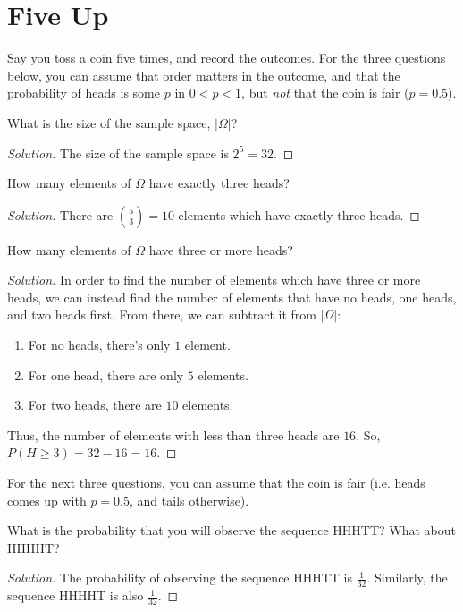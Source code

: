 \documentclass{article}
\newenvironment{solution}{\begin{proof}[Solution]}{\end{proof}}
\begin{document}
\newpage

\section{Five Up}
Say you toss a coin five times, and record the outcomes. For the three questions below, you can assume that order matters in the outcome, and that the probability of heads is some $p$ in $0 < p < 1$, but \textit{not} that the coin is fair ($p = 0.5$).

\begin{hw}
	What is the size of the sample space, $|\Omega|$?
\end{hw}
\begin{solution}
	The size of the sample space is $2^{5} = 32$.
\end{solution}

\begin{hw}
	How many elements of $\Omega$ have exactly three heads?
\end{hw}
\begin{solution}
	There are $\binom{5}{3} = 10$ elements which have exactly three heads.
\end{solution}

\begin{hw}
	How many elements of $\Omega$ have three or more heads?
\end{hw}
\begin{solution}
	In order to find the number of elements which have three or more heads, we can instead find the number of elements that have no heads, one heads, and two heads first. From there, we can subtract it from $\lvert \Omega \rvert$:
	\begin{enumerate}
		\item For no heads, there's only $1$ element.
		\item For one head, there are only $5$ elements.
		\item For two heads, there are $10$ elements.
	\end{enumerate}

	Thus, the number of elements with less than three heads are $16$. So, $P(H \geq 3) = 32 - 16 = 16$.
\end{solution}

For the next three questions, you can assume that the coin is fair (i.e. heads comes up with $p=0.5$, and tails otherwise).
\begin{hw}
	What is the probability that you will observe the sequence HHHTT? What about HHHHT?
\end{hw}
\begin{solution}
	The probability of observing the sequence HHHTT is $\frac{1}{32}$. Similarly, the sequence HHHHT is also $\frac{1}{32}$.
\end{solution}
\end{document}

